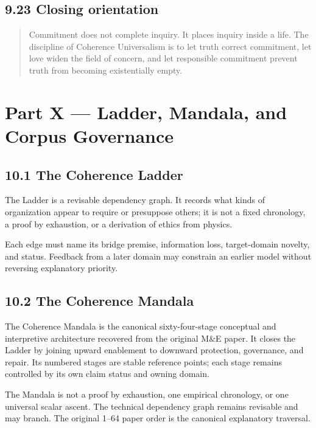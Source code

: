 \documentclass[
  11pt,
]{article}
\begin{document}
\subsection{9.23 Closing orientation}\label{closing-orientation}

\begin{quote}
Commitment does not complete inquiry. It places inquiry inside a life.
The discipline of Coherence Universalism is to let truth correct
commitment, let love widen the field of concern, and let responsible
commitment prevent truth from becoming existentially empty.
\end{quote}

\section{Part X --- Ladder, Mandala, and Corpus
Governance}\label{part-x-ladder-mandala-and-corpus-governance}

\subsection{10.1 The Coherence Ladder}\label{the-coherence-ladder}

The Ladder is a revisable dependency graph. It records what kinds of
organization appear to require or presuppose others; it is not a fixed
chronology, a proof by exhaustion, or a derivation of ethics from
physics.

Each edge must name its bridge premise, information loss, target-domain
novelty, and status. Feedback from a later domain may constrain an
earlier model without reversing explanatory priority.

\subsection{10.2 The Coherence Mandala}\label{the-coherence-mandala}

The Coherence Mandala is the canonical sixty-four-stage conceptual and
interpretive architecture recovered from the original M\&E paper. It
closes the Ladder by joining upward enablement to downward protection,
governance, and repair. Its numbered stages are stable reference points;
each stage remains controlled by its own claim status and owning domain.

The Mandala is not a proof by exhaustion, one empirical chronology, or
one universal scalar ascent. The technical dependency graph remains
revisable and may branch. The original 1--64 paper order is the
canonical explanatory traversal.
\end{document}
